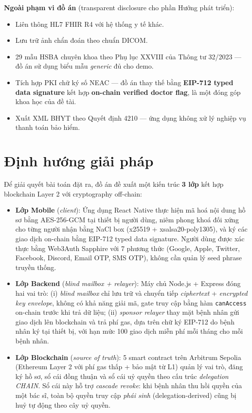 \documentclass[../DoAn]{subfiles}
\begin{document}
\textbf{Ngoài phạm vi đồ án} (transparent disclosure cho phần Hướng phát triển):
\begin{itemize}
    \item Liên thông HL7 FHIR R4 với hệ thống y tế khác.
    \item Lưu trữ ảnh chẩn đoán theo chuẩn DICOM.
    \item 29 mẫu HSBA chuyên khoa theo Phụ lục XXVIII của Thông tư 32/2023 --- đồ án sử dụng biểu mẫu \textit{generic} đủ cho demo.
    \item Tích hợp PKI chữ ký số NEAC --- đồ án thay thế bằng \textbf{EIP-712 typed data signature} kết hợp \textbf{on-chain verified doctor flag}, là một đóng góp khoa học của đề tài.
    \item Xuất XML BHYT theo Quyết định 4210 --- ứng dụng không xử lý nghiệp vụ thanh toán bảo hiểm.
\end{itemize}

\section{Định hướng giải pháp}

Để giải quyết bài toán đặt ra, đồ án đề xuất một kiến trúc \textbf{3 lớp} kết hợp blockchain Layer 2 với cryptography off-chain:

\begin{itemize}
    \item \textbf{Lớp Mobile} (\textit{client}): Ứng dụng React Native thực hiện mã hoá nội dung hồ sơ bằng AES-256-GCM tại thiết bị người dùng, niêm phong khoá đối xứng cho từng người nhận bằng NaCl box (x25519 + xsalsa20-poly1305), và ký các giao dịch on-chain bằng EIP-712 typed data signature. Người dùng được xác thực bằng Web3Auth Sapphire với 7 phương thức (Google, Apple, Twitter, Facebook, Discord, Email OTP, SMS OTP), không cần quản lý seed phrase truyền thống.
    \item \textbf{Lớp Backend} (\textit{blind mailbox + relayer}): Máy chủ Node.js + Express đóng hai vai trò: (i) \textit{blind mailbox} chỉ lưu trữ và chuyển tiếp \textit{ciphertext} + \textit{encrypted key envelope}, không có khả năng giải mã, gate truy cập bằng hàm \texttt{canAccess} on-chain trước khi trả dữ liệu; (ii) \textit{sponsor relayer} thay mặt bệnh nhân gửi giao dịch lên blockchain và trả phí gas, dựa trên chữ ký EIP-712 do bệnh nhân ký tại thiết bị, với hạn mức 100 giao dịch miễn phí mỗi tháng cho mỗi bệnh nhân.
    \item \textbf{Lớp Blockchain} (\textit{source of truth}): 5 smart contract trên Arbitrum Sepolia (Ethereum Layer 2 với phí gas thấp + bảo mật từ L1) quản lý vai trò, đăng ký hồ sơ, sổ cái đồng thuận và sổ cái uỷ quyền theo cấu trúc \textit{delegation CHAIN}. Sổ cái này hỗ trợ \textit{cascade revoke}: khi bệnh nhân thu hồi quyền của một bác sĩ, toàn bộ quyền truy cập \textit{phái sinh} (delegation-derived) cũng bị huỷ tự động theo cây uỷ quyền.
\end{itemize}
\end{document}
